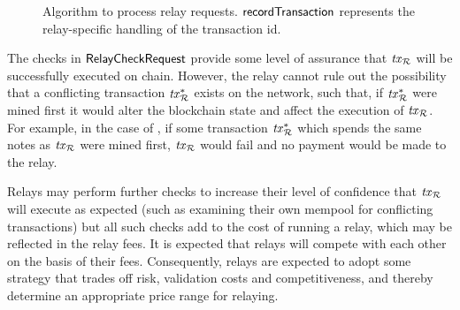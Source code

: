 \begin{figure}[!h]
  \centering
  \caption{Algorithm to process relay requests. $\mathsf{recordTransaction}$ represents the relay-specific handling of the transaction id.}
  \label{relay-proof-permission:fig:relay-handle-request}
\end{figure}


\begin{remark}\label{relay-proof-permission:transaction-failure-cases}
  The checks in $\mathsf{RelayCheckRequest}$ provide some level of assurance that $\mathit{tx}_{\mathcal{R}}$ will be successfully executed on chain. However, the relay cannot rule out the possibility that a conflicting transaction $\mathit{tx}_{\mathcal{R}}^*$ exists on the network, such that, if $\mathit{tx}_{\mathcal{R}}^*$ were mined first it would alter the blockchain state and affect the execution of $\mathit{tx}_{\mathcal{R}}$. For example, in the case of \zeth, if some transaction $\mathit{tx}_{\mathcal{R}}^*$ which spends the same notes as $\mathit{tx}_{\mathcal{R}}$ were mined first, $\mathit{tx}_{\mathcal{R}}$ would fail and no payment would be made to the relay.

Relays may perform further checks to increase their level of confidence that $\mathit{tx}_{\mathcal{R}}$ will execute as expected (such as examining their own mempool for conflicting transactions) but all such checks add to the cost of running a relay, which may be reflected in the relay fees. It is expected that relays will compete with each other on the basis of their fees. Consequently, relays are expected to adopt some strategy that trades off risk, validation costs and competitiveness, and thereby determine an appropriate price range for relaying.
\end{remark}

